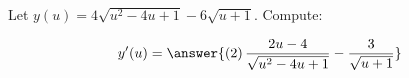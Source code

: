 \documentclass{ximera}
\author{Bobby Ramsey}
\begin{document}
\begin{exercise}
	Let $y(u) = 4\sqrt{u^2-4u+1} - 6 \sqrt{u+1}$. 
	Compute:

	\[ y'(u) =\answer{ \left(2\right) \frac{2u-4}{\sqrt{u^2-4u+1}} - \frac{3}{\sqrt{u+1}} } \]
\end{exercise}
\end{document}
